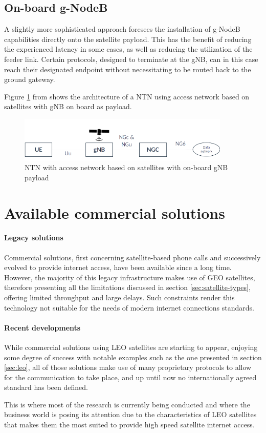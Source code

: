 \subsection{On-board g-NodeB}
\label{sec:onboard-gnb}
A slightly more sophisticated approach foresees the installation of g-NodeB capabilities directly onto the satellite payload. This has the benefit of reducing the experienced latency in some cases, as well as reducing the utilization of the feeder link. Certain protocols, designed to terminate at the \ac{gNB}, can in this case reach their designated endpoint without necessitating to be routed back to the ground gateway.

Figure \ref{fig:ntn-gnb-onboard} from \cite{3gpp-tr-38.811} shows the architecture of a \ac{NTN} using access network based on satellites with \ac{gNB} on board as payload.

\begin{figure}[ht]
    \centering
    \includegraphics[width=0.9\textwidth]{res/ntn-regen.png}
    \caption{NTN with access network based on satellites with on-board gNB payload \cite{3gpp-tr-38.811}}
    \label{fig:ntn-gnb-onboard}
\end{figure}

\section{Available commercial solutions}
\paragraph{Legacy solutions}
Commercial solutions, first concerning satellite-based phone calls and successively evolved to provide internet access, have been available since a long time. However, the majority of this legacy infrastructure makes use of \ac{GEO} satellites, therefore presenting all the limitations discussed in section \ref{sec:satellite-types}, offering limited throughput and large delays. Such constraints render this technology not suitable for the needs of modern internet connections standards.

\paragraph{Recent developments}
While commercial solutions using \ac{LEO} satellites are starting to appear, enjoying some degree of success with notable examples such as the one presented in section \ref{sec:leo}, all of those solutions make use of many proprietary protocols to allow for the communication to take place, and up until now no internationally agreed standard has been defined.

This is where most of the research is currently being conducted and where the business world is posing its attention due to the characteristics of \ac{LEO} satellites that makes them the most suited to provide high speed satellite internet access.